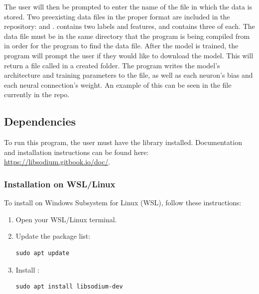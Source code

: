 \documentclass[12pt]{article}
\begin{document}
 The user will then be prompted to enter the name of the file in which the data is stored. Two preexisting data files in the proper format are included in the repository:  and .  contains two labels and features, and  contains three of each. The data file must be in the same directory that the program is being compiled from in order for the program to find the data file. After the model is trained, the program will prompt the user if they would like to download the model. This will return a file called  in a created folder. The program writes the model’s architecture and training parameters to the file, as well as each neuron’s bias and each neural connection’s weight. An example of this can be seen in the  file currently in the repo.

\subsection{Dependencies}

To run this program, the user must have the  library installed. Documentation and installation instructions can be found here: \url{https://libsodium.gitbook.io/doc/}. 

\subsubsection{ Installation on WSL/Linux}

To install  on Windows Subsystem for Linux (WSL), follow these instructions:

\begin{enumerate}
    \item Open your WSL/Linux terminal.
    \item Update the package list:
 	\begin{mdframed}[style=myboxstyleTerminal1]
		\begin{verbatim}
sudo apt update
		\end{verbatim}
	\end{mdframed}
    \item Install :
 	\begin{mdframed}[style=myboxstyleTerminal1]
		\begin{verbatim}
sudo apt install libsodium-dev
		\end{verbatim}
	\end{mdframed}
\end{enumerate}
\end{document}
